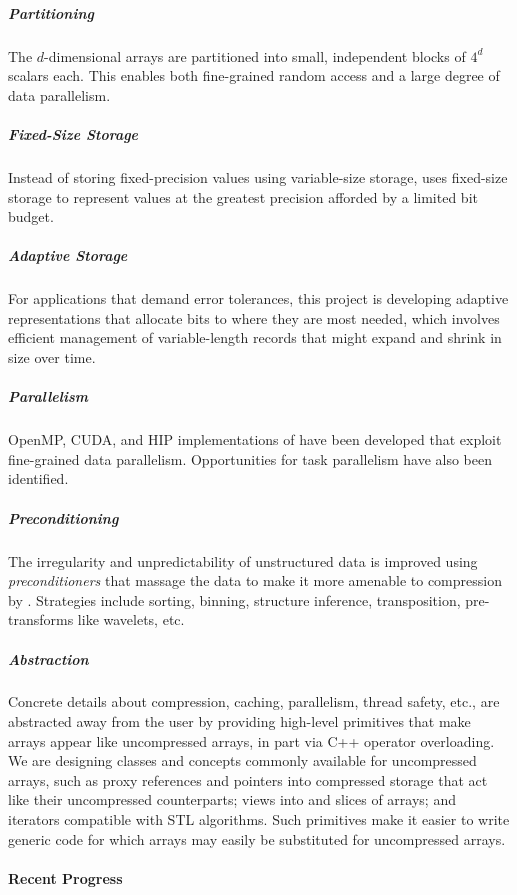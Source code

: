 \subparagraph{Partitioning}  The $d$-dimensional arrays are partitioned
into small, independent blocks of $4^d$ scalars each.  This enables both
fine-grained random access and a large degree of data parallelism.

\subparagraph{Fixed-Size Storage}  Instead of storing fixed-precision
values using variable-size storage, {\zfp} uses fixed-size storage to
represent values at the greatest precision afforded by a limited
bit budget.

\subparagraph{Adaptive Storage}  For applications that demand error
tolerances, this project is developing adaptive representations that
allocate bits to where they are most needed, which involves efficient
management of variable-length records that might expand and shrink in
size over time.

\subparagraph{Parallelism}  OpenMP, CUDA, and HIP implementations of {\zfp}
have been developed that exploit fine-grained data parallelism.
Opportunities for task parallelism have also been identified.

\subparagraph{Preconditioning}  The irregularity and unpredictability
of unstructured data is improved using \emph{preconditioners} that
massage the data to make it more amenable to compression by {\zfp}.
Strategies include sorting, binning, structure inference, transposition,
pre-transforms like wavelets, etc.

\subparagraph{Abstraction}  Concrete details about compression, caching,
parallelism, thread safety, etc., are abstracted away from the user by
providing high-level primitives that make {\zfp} arrays appear like
uncompressed arrays, in part via C++ operator overloading.  We are
designing classes and concepts commonly available for uncompressed arrays,
such as proxy references and pointers into compressed storage that act
like their uncompressed counterparts; views into and slices of arrays;
and iterators compatible with STL algorithms.  Such primitives make it
easier to write generic code for which {\zfp} arrays may easily be
substituted for uncompressed arrays.

\paragraph{Recent Progress}

